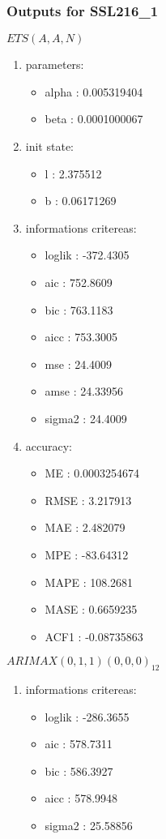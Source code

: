 \documentclass[10pt,a4paper]{article}\usepackage[]{graphicx}\usepackage[]{color}
\newcommand{\AaA}{\_}
\begin{document}
\subsubsection{Outputs for SSL216\AaA 1}
\begin{multicols}{2}


$ ETS(A,A,N) $
\begin{enumerate}
\item parameters:
\begin{itemize}
\item  alpha :  0.005319404 
\item  beta :  0.0001000067 
\end{itemize}
\item init state:
\begin{itemize}
\item  l :  2.375512 
\item  b :  0.06171269 
\end{itemize}
\item informations critereas:
\begin{itemize}
\item  loglik :  -372.4305 
\item  aic :  752.8609 
\item  bic :  763.1183 
\item  aicc :  753.3005 
\item  mse :  24.4009 
\item  amse :  24.33956 
\item  sigma2 :  24.4009 
\end{itemize}
\item accuracy:
\begin{itemize}
\item  ME :  0.0003254674 
\item  RMSE :  3.217913 
\item  MAE :  2.482079 
\item  MPE :  -83.64312 
\item  MAPE :  108.2681 
\item  MASE :  0.6659235 
\item  ACF1 :  -0.08735863 
\end{itemize}
\end{enumerate}

\columnbreak


 $ARIMAX(0,1,1)(0,0,0)_{12}$ 
\begin{enumerate}
\item informations critereas:
\begin{itemize}
\item  loglik :  -286.3655 
\item  aic :  578.7311 
\item  bic :  586.3927 
\item  aicc :  578.9948 
\item  sigma2 :  25.58856 
\end{itemize}


\end{enumerate}
\end{multicols}
\end{document}
